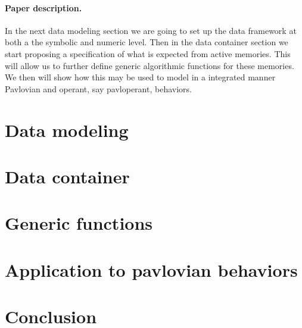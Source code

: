\documentclass[a4,12pt,twoside]{article}
\begin{document}
\paragraph{Paper description.} In the next data modeling section we are going to set up the data framework at both a the symbolic and numeric level. Then in the data container section we start proposing a specification of what is expected from active memories. This will allow us to further define generic algorithmic functions for these memories. We then will show how this may be used to model in a integrated manner Pavlovian and operant, say pavloperant, behaviors.

\iftrue

\section{Data modeling}

\section{Data container}

\section{Generic functions}

\section{Application to pavlovian behaviors}

\section{Conclusion}

\fi

{\scriptsize  }

\end{document}
